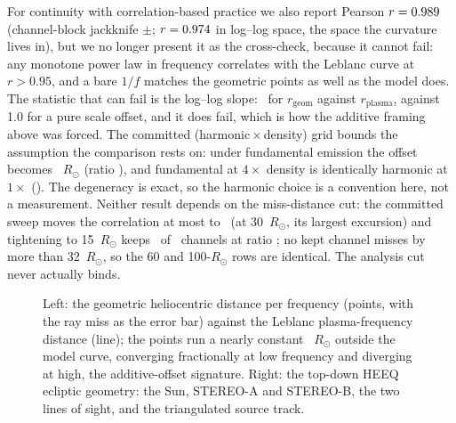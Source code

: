 \documentclass[twocolumn]{aastex631}
\begin{document}
For continuity with correlation-based practice we also report Pearson $r=0.989$
(channel-block jackknife $\pm$\triCorrJkSe; $r=0.974$ in log--log space, the space the
curvature lives in), but we no longer present it as the cross-check, because it cannot fail:
any monotone power law in frequency correlates with the Leblanc curve at $r>0.95$, and a bare
$1/f$ matches the geometric points as well as the model does. The statistic that can fail is the
log--log slope: \triSlopeGvsP\ for $r_\mathrm{geom}$ against $r_\mathrm{plasma}$, against 1.0
for a pure scale offset, and it does fail, which is how the additive framing above was
forced. The committed (harmonic\,$\times$\,density) grid bounds the assumption the comparison
rests on: under fundamental emission the offset becomes \triGridHOneDiff~$R_\odot$ (ratio
\triGridHOneRatio), and fundamental at $4\times$ density is identically harmonic at $1\times$
(\triGridHOneSFourRatio). The degeneracy is exact, so the harmonic choice is a convention
here, not a measurement. Neither result depends on the miss-distance cut: the committed sweep
moves the correlation at most to \triSweepThirtyCorr\ (at 30~$R_\odot$, its largest excursion)
and tightening to 15~$R_\odot$ keeps \triSweepFifteenN\ of \triSweepSixtyN\ channels at ratio
\triSweepFifteenRatio; no kept channel misses by more than 32~$R_\odot$, so the 60 and
100-$R_\odot$ rows are identical. The analysis cut never actually binds.

\begin{figure}
\caption{Left: the geometric heliocentric distance per frequency (points, with the ray miss as
the error bar) against the Leblanc plasma-frequency distance (line); the points run a nearly
constant \triDiffMed~$R_\odot$ outside the model curve, converging fractionally at low
frequency and diverging at high, the additive-offset signature. Right: the top-down HEEQ
ecliptic geometry: the Sun, STEREO-A and STEREO-B, the two lines of sight, and the triangulated
source track.}
\label{fig:tri}
\end{figure}
\end{document}

